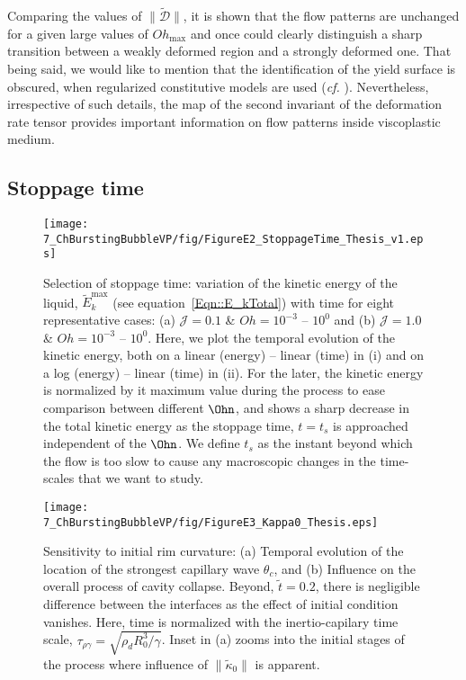 \begin{subappendices}
Comparing the values of $\|\boldsymbol{\tilde{\mathcal{D}}}\|$, it is shown that the flow patterns are unchanged for a given large values of $Oh_{\text{max}}$ and once could clearly distinguish a sharp transition between a weakly deformed region and a strongly deformed one. That being said, we would like to mention that the identification of the yield surface is obscured, when regularized constitutive models are used (\textit{cf.} \citep{frigaard2005usage}). Nevertheless, irrespective of such details, the map of the second invariant of the deformation rate tensor provides important information on flow patterns inside viscoplastic medium.

\subsection{Stoppage time}\label{App::StoppageTime}

\begin{figure}
	\centering
	\texttt{[image: 7\_ChBurstingBubbleVP/fig/FigureE2\_StoppageTime\_Thesis\_v1.eps]}
	\caption{Selection of stoppage time: variation of the kinetic energy of the liquid, $\tilde E_k^{\text{max}}$ (see equation~\eqref{Eqn::E_kTotal}) with time for eight representative cases: (a) $\mathcal{J} = 0.1$ \& $Oh = 10^{-3}$ -- $10^0$ and (b) $\mathcal{J} = 1.0$  \& $Oh = 10^{-3}$ -- $10^0$. Here, we plot the temporal evolution of the kinetic energy, both on a linear (energy) -- linear (time) in (i) and on a log (energy) -- linear (time) in (ii). For the later, the kinetic energy is normalized by it maximum value during the process to ease comparison between different $\Ohn$, and shows a sharp decrease in the total kinetic energy as the stoppage time, $t = t_s$ is approached independent of the $\Ohn$. We define $t_s$ as the instant beyond which the flow is too slow to cause any macroscopic changes in the time-scales that we want to study.}
	\label{fig:StoppageTime}
\end{figure}

\begin{sidewaysfigure}
	\centering
	\texttt{[image: 7\_ChBurstingBubbleVP/fig/FigureE3\_Kappa0\_Thesis.eps]}
	\caption{Sensitivity to initial rim curvature: (a) Temporal evolution of the location of the strongest capillary wave $\theta_c$, and (b) Influence on the overall process of cavity collapse. Beyond, $\tilde t = 0.2$, there is negligible difference between the interfaces as the effect of initial condition vanishes. Here, time is normalized with the inertio-capilary time scale, $\tau_{\rho\gamma} = \sqrt{\rho_d R_0^3/\gamma}$. Inset in (a) zooms into the initial stages of the process where influence of $\|\tilde \kappa_0\|$ is apparent.}
	\label{fig:kappa0}
\end{sidewaysfigure}


\end{subappendices}
